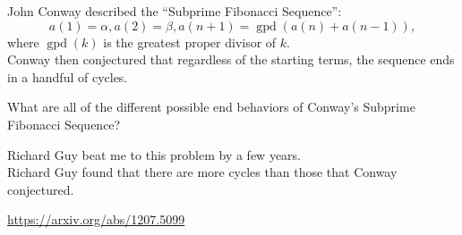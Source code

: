 \documentclass{article}
\begin{document}
John Conway described the ``Subprime Fibonacci Sequence'': \[
  a(1) = \alpha, a(2) = \beta, a(n + 1) = \operatorname{gpd}(a(n) + a(n - 1)),
\] where $\operatorname{gpd}(k)$ is the greatest proper divisor of $k$.\\
Conway then conjectured that regardless of the starting terms, the sequence
ends in a handful of cycles.
\begin{question}
  What are all of the different possible end behaviors of
  Conway's Subprime Fibonacci Sequence?
\end{question}

\begin{note}
  Richard Guy beat me to this problem by a few years.\\
  Richard Guy found that there are more cycles than
  those that Conway conjectured.
\end{note}

\begin{references}
  \item \url{https://arxiv.org/abs/1207.5099}
\end{references}
\end{document}
